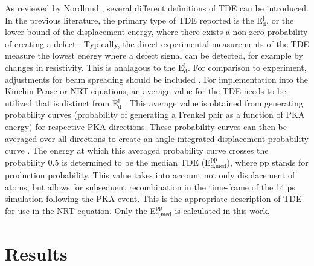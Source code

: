 \documentclass[review]{elsarticle}
\begin{document}
\FloatBarrier

As reviewed by Nordlund \cite{nordlund2006}, several different definitions of TDE can be introduced. In the previous literature, the primary type of TDE reported is the E$^{\textrm{l}}_{\textrm{d}}$, or the lower bound of the displacement energy, where there exists a non-zero probability of creating a defect \cite{malerba2002}. Typically, the direct experimental measurements of the TDE measure the lowest energy where a defect signal can be detected, for example by changes in resistivity. This is analagous to the E$^{\textrm{l}}_{\textrm{d}}$. For comparison to experiment, adjustments for beam spreading should be included \cite{nordlund2006}. For implementation into the Kinchin-Pease or NRT equations, an average value for the TDE needs to be utilized that is distinct from E$^{\textrm{l}}_{\textrm{d}}$ \cite{nordlund2006,norgett1975}. This average value is obtained from generating probability curves (probability of generating a Frenkel pair as a function of PKA energy) for respective PKA directions. These probability curves can then be averaged over all directions to create an angle-integrated displacement probability curve \cite{nordlund2006}. The energy at which this averaged probability curve crosses the probability 0.5 is determined to be the median TDE (E$^{\textrm{pp}}_{\textrm{d,med}}$), where pp stands for production probability. This value takes into account not only displacement of atoms, but allows for subsequent recombination in the time-frame of the 14 ps simulation following the PKA event. This is the appropriate description of TDE for use in the NRT equation. Only the E$^{\textrm{pp}}_{\textrm{d,med}}$ is calculated in this work.

\section{Results}
\end{document}
